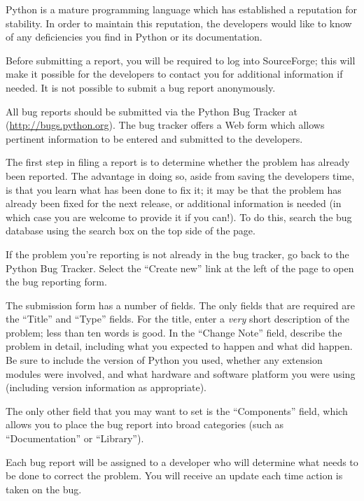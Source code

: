 \label{reporting-bugs}

Python is a mature programming language which has established a
reputation for stability.  In order to maintain this reputation, the
developers would like to know of any deficiencies you find in Python
or its documentation.

Before submitting a report, you will be required to log into SourceForge;
this will make it possible for the developers to contact you
for additional information if needed.  It is not possible to submit a
bug report anonymously.

All bug reports should be submitted via the Python Bug Tracker at
(\url{http://bugs.python.org}).  The
bug tracker offers a Web form which allows pertinent information to be
entered and submitted to the developers.

The first step in filing a report is to determine whether the problem
has already been reported.  The advantage in doing so, aside from
saving the developers time, is that you learn what has been done to
fix it; it may be that the problem has already been fixed for the next
release, or additional information is needed (in which case you are
welcome to provide it if you can!).  To do this, search the bug
database using the search box on the top side of the page.

If the problem you're reporting is not already in the bug tracker, go
back to the Python Bug Tracker.  Select the
``Create new'' link at the left of the page to open the bug reporting
form.

The submission form has a number of fields.  The only fields that are
required are the ``Title'' and ``Type'' fields.  For the title,
enter a \emph{very} short description of the problem; less than ten
words is good.  In the ``Change Note'' field, describe the problem in detail,
including what you expected to happen and what did happen.  Be sure to
include the version of Python you used, whether any extension modules
were involved, and what hardware and software platform you were using
(including version information as appropriate).

The only other field that you may want to set is the ``Components''
field, which allows you to place the bug report into broad categories
(such as ``Documentation'' or ``Library'').

Each bug report will be assigned to a developer who will determine
what needs to be done to correct the problem.  You will
receive an update each time action is taken on the bug.


\begin{seealso}

\end{seealso}
